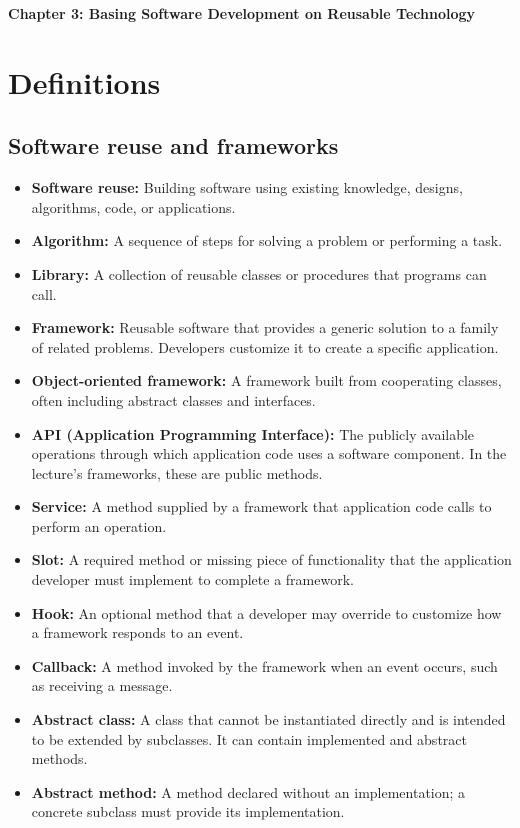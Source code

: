 \documentclass[11pt]{article}
\newcommand{\Title}[1]{%
  \begin{center}
    \fontsize{16}{28}\selectfont\textbf{#1}
  \end{center}
}
\newenvironment{DottedList}{%
  \begin{itemize}[leftmargin=2em, itemsep=0.35em, topsep=0.35em, label=\textbullet]
}{%
  \end{itemize}
}
\begin{document}
\Title{Chapter 3: Basing Software Development on Reusable Technology}

\section*{Definitions}
\subsection*{Software reuse and frameworks}
\begin{DottedList}
  \item \textbf{Software reuse:} Building software using existing knowledge, designs, algorithms, code, or applications.
  \item \textbf{Algorithm:} A sequence of steps for solving a problem or performing a task.
  \item \textbf{Library:} A collection of reusable classes or procedures that programs can call.
  \item \textbf{Framework:} Reusable software that provides a generic solution to a family of related problems. Developers customize it to create a specific application.
  \item \textbf{Object-oriented framework:} A framework built from cooperating classes, often including abstract classes and interfaces.
  \item \textbf{API (Application Programming Interface):} The publicly available operations through which application code uses a software component. In the lecture's frameworks, these are public methods.
  \item \textbf{Service:} A method supplied by a framework that application code calls to perform an operation.
  \item \textbf{Slot:} A required method or missing piece of functionality that the application developer must implement to complete a framework.
  \item \textbf{Hook:} An optional method that a developer may override to customize how a framework responds to an event.
  \item \textbf{Callback:} A method invoked by the framework when an event occurs, such as receiving a message.
  \item \textbf{Abstract class:} A class that cannot be instantiated directly and is intended to be extended by subclasses. It can contain implemented and abstract methods.
  \item \textbf{Abstract method:} A method declared without an implementation; a concrete subclass must provide its implementation.

\end{DottedList}
\end{document}
